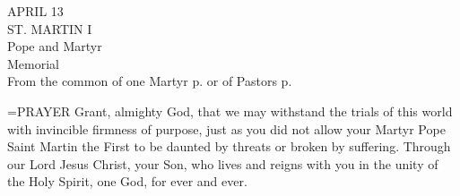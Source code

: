 \begin{center}\normalsize APRIL 13\\
\footnotesize ST. MARTIN I\\
\footnotesize Pope and Martyr\\
\footnotesize Memorial\\
\footnotesize From the common of one Martyr p.    or of Pastors p. \\
\end{center}

\hangindent=\parindent \small{PRAYER 
Grant, almighty God,
that we may withstand the trials of this world
with invincible firmness of purpose,
just as you did not allow your Martyr Pope Saint Martin the First
to be daunted by threats or broken by suffering.
Through our Lord Jesus Christ, your Son,
who lives and reigns with you in the unity of the Holy Spirit,
one God, for ever and ever.\\}
 
